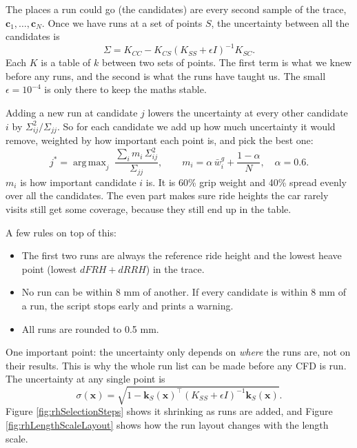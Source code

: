 The places a run could go (the candidates) are every second sample of the trace, $\mathbf{c}_1,\dots,\mathbf{c}_N$. Once we have runs at a set of points $S$, the uncertainty between all the candidates is
\begin{equation}
    \Sigma = K_{CC} - K_{CS}\left(K_{SS} + \epsilon I\right)^{-1}K_{SC}.
\end{equation}
Each $K$ is a table of $k$ between two sets of points. The first term is what we knew before any runs, and the second is what the runs have taught us. The small $\epsilon = 10^{-4}$ is only there to keep the maths stable.

Adding a new run at candidate $j$ lowers the uncertainty at every other candidate $i$ by $\Sigma_{ij}^2 / \Sigma_{jj}$. So for each candidate we add up how much uncertainty it would remove, weighted by how important each point is, and pick the best one:
\begin{equation}
    j^{*} = \mathop{\mathrm{arg\,max}}_{j}\; \frac{\sum_i m_i\,\Sigma_{ij}^2}{\Sigma_{jj}}, \qquad m_i = \alpha\,\bar w^{g}_i + \frac{1 - \alpha}{N}, \quad \alpha = 0.6.
\end{equation}
$m_i$ is how important candidate $i$ is. It is 60\% grip weight and 40\% spread evenly over all the candidates. The even part makes sure ride heights the car rarely visits still get some coverage, because they still end up in the table.

A few rules on top of this:
\begin{itemize}
    \item The first two runs are always the reference ride height and the lowest heave point (lowest $dFRH + dRRH$) in the trace.
    \item No run can be within 8 mm of another. If every candidate is within 8 mm of a run, the script stops early and prints a warning.
    \item All runs are rounded to 0.5 mm.
\end{itemize}

One important point: the uncertainty only depends on \textit{where} the runs are, not on their results. This is why the whole run list can be made before any CFD is run. The uncertainty at any single point is
\begin{equation}
    \sigma(\mathbf{x}) = \sqrt{1 - \mathbf{k}_S(\mathbf{x})^{\top}\left(K_{SS} + \epsilon I\right)^{-1}\mathbf{k}_S(\mathbf{x})}.
\end{equation}
Figure \ref{fig:rhSelectionSteps} shows it shrinking as runs are added, and Figure \ref{fig:rhLengthScaleLayout} shows how the run layout changes with the length scale.

